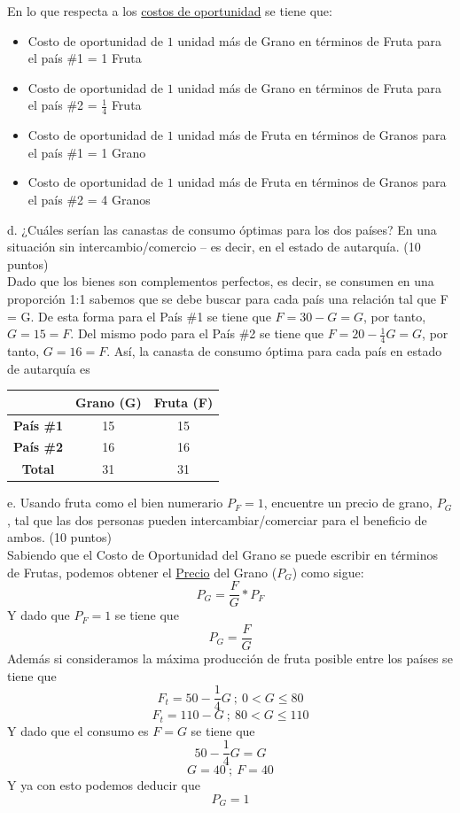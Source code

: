 \documentclass[12pt,dvipsnames]{article}
\begin{document}
En lo que respecta a los \underline{costos de oportunidad} se tiene que:
\begin{itemize}
	\item Costo de oportunidad de $1$ unidad más de Grano en términos de Fruta para el país \#1 = 1 Fruta
	\item Costo de oportunidad de $1$ unidad más de Grano en términos de Fruta para el país \#2 = $\frac{1}{4}$ Fruta
	\item Costo de oportunidad de $1$ unidad más de Fruta en términos de Granos para el país \#1 = 1 Grano
	\item Costo de oportunidad de $1$ unidad más de Fruta en términos de Granos para el país \#2 = 4 Granos
\end{itemize}

d.	¿Cuáles serían las canastas de consumo óptimas para los dos países? En una situación sin intercambio/comercio – es decir, en el estado de autarquía. (10 puntos)\\

Dado que los bienes son complementos perfectos, es decir, se consumen en una proporción 1:1 sabemos que se debe buscar para cada país una relación tal que F = G. De esta forma para el País \#1 se tiene que $F = 30 - G = G$, por tanto, $G = 15 = F$. Del mismo podo para el País \#2 se tiene que $F = 20 - \frac{1}{4}G = G$, por tanto, $G = 16 = F$. Así, la canasta de consumo óptima para cada país en estado de autarquía es


\begin{table}[h]
	\centering	
	\begin{tabular}{ccc}
	                  & \textbf{Grano (G)} & \textbf{Fruta (F)} \\ \hline
	\textbf{País \#1} & 15                 & 15                 \\
	\textbf{País \#2} & 16                 & 16                 \\ \hline
	\textbf{Total}    & 31                 & 31                
\end{tabular}

\end{table}
\newpage

e. Usando fruta como el bien numerario $P_F=1$, encuentre un precio de grano, $P_G$, tal que las dos personas pueden intercambiar/comerciar para el beneficio de ambos.  (10 puntos)\\

Sabiendo que el Costo de Oportunidad del Grano se puede escribir en términos de Frutas, podemos obtener el \underline{Precio} del Grano ($P_G$) como sigue:
$$P_G = \frac{F}{G}*P_F$$
Y dado que $P_F=1$ se tiene que 
$$P_G=\frac{F}{G}$$
Además si consideramos la máxima producción de fruta posible entre los países se tiene que
$$F_t = 50 - \frac{1}{4}G \: ; \: 0 < G \leq 80$$
$$F_t = 110 - G \: ; \: 80 < G \leq 110$$
Y dado que el consumo es $F = G$ se tiene que
$$50 - \frac{1}{4}G = G$$
$$G = 40 \: ; \: F = 40$$
Y ya con esto podemos deducir que
$$P_G = 1$$
\end{document}
